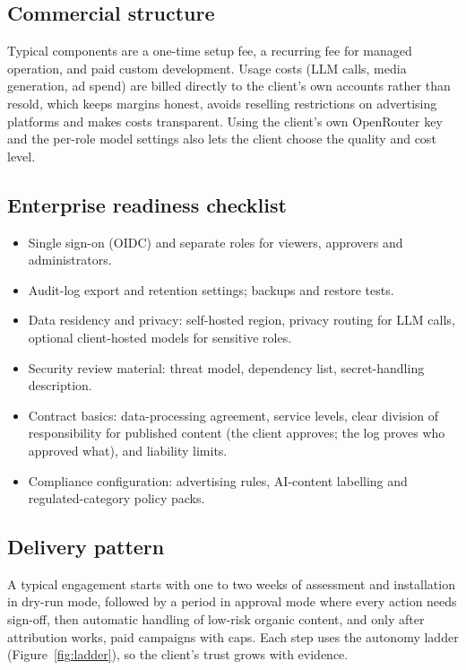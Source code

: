 \documentclass[11pt,a4paper]{article}
\begin{document}
\subsection{Commercial structure}
Typical components are a one-time setup fee, a recurring fee for managed operation, and paid custom development. Usage costs (LLM calls, media generation, ad spend) are billed directly to the client's own accounts rather than resold, which keeps margins honest, avoids reselling restrictions on advertising platforms and makes costs transparent. Using the client's own OpenRouter key and the per-role model settings also lets the client choose the quality and cost level.

\subsection{Enterprise readiness checklist}
\begin{itemize}
  \item Single sign-on (OIDC) and separate roles for viewers, approvers and administrators.
  \item Audit-log export and retention settings; backups and restore tests.
  \item Data residency and privacy: self-hosted region, privacy routing for LLM calls, optional client-hosted models for sensitive roles.
  \item Security review material: threat model, dependency list, secret-handling description.
  \item Contract basics: data-processing agreement, service levels, clear division of responsibility for published content (the client approves; the log proves who approved what), and liability limits.
  \item Compliance configuration: advertising rules, AI-content labelling and regulated-category policy packs.
\end{itemize}

\subsection{Delivery pattern}
A typical engagement starts with one to two weeks of assessment and installation in dry-run mode, followed by a period in approval mode where every action needs sign-off, then automatic handling of low-risk organic content, and only after attribution works, paid campaigns with caps. Each step uses the autonomy ladder (Figure~\ref{fig:ladder}), so the client's trust grows with evidence.
\end{document}

